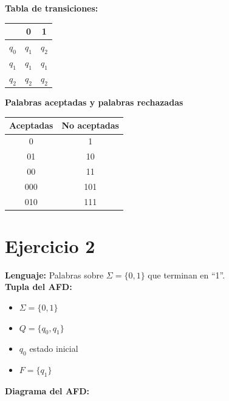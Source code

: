 \documentclass{article}
\begin{document}
\textbf{Tabla de transiciones:}

\begin{center}
\begin{tabular}{|c|c|c|}
\hline & 0 & 1   \\ \hline
$q_0$ & $q_1$ & $q_2$ \\ \hline
$q_1$ & $q_1$ & $q_1$ \\ \hline
$q_2$ & $q_2$ & $q_2$ \\ \hline
\end{tabular}
\end{center}

\textbf{Palabras aceptadas y palabras rechazadas}
\begin{center}
\begin{tabular}{|c|c|}
\hline
Aceptadas & No aceptadas \\
\hline
0 & 1 \\
01 & 10 \\
00 & 11 \\
000 & 101 \\
010 & 111 \\
\hline
\end{tabular}
\end{center}

\section*{Ejercicio 2}
\textbf{Lenguaje:} Palabras sobre $\Sigma = \{0,1\}$ que terminan en “1”. \\

\textbf{Tupla del AFD:}
\begin{itemize}
    \item $\Sigma = \{0,1\}$
    \item $Q = \{q_0, q_1\}$
    \item $q_0$ estado inicial
    \item $F = \{q_1\}$
\end{itemize}

\textbf{Diagrama del AFD:}

\begin{center}
\end{center}
\end{document}
